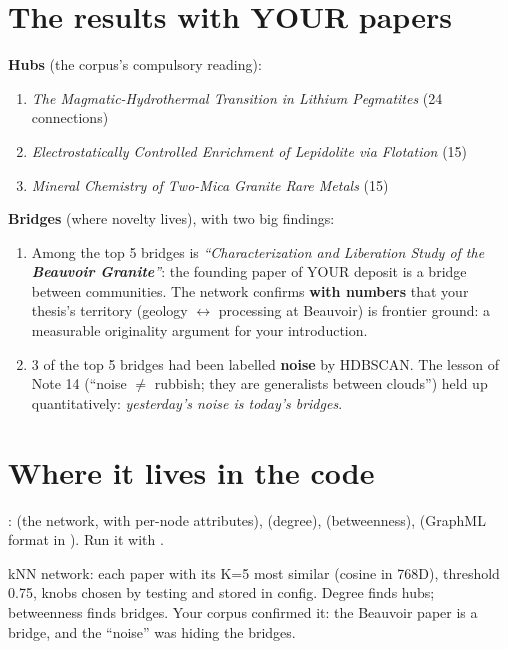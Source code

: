 \documentclass[11pt,a4paper]{article}
\begin{document}
\section{The results with YOUR papers}

\textbf{Hubs} (the corpus's compulsory reading):
\begin{enumerate}
  \item \emph{The Magmatic-Hydrothermal Transition in Lithium Pegmatites} (24 connections)
  \item \emph{Electrostatically Controlled Enrichment of Lepidolite via Flotation} (15)
  \item \emph{Mineral Chemistry of Two-Mica Granite Rare Metals} (15)
\end{enumerate}

\textbf{Bridges} (where novelty lives), with two big findings:
\begin{enumerate}
  \item Among the top 5 bridges is \emph{``Characterization and Liberation Study of the
        \textbf{Beauvoir Granite}''}: the founding paper of YOUR deposit is a bridge between
        communities. The network confirms \textbf{with numbers} that your thesis's territory
        (geology $\leftrightarrow$ processing at Beauvoir) is frontier ground: a measurable
        originality argument for your introduction.
  \item 3 of the top 5 bridges had been labelled \textbf{noise} by HDBSCAN. The lesson of Note
        14 (``noise $\neq$ rubbish; they are generalists between clouds'') held up
        quantitatively: \emph{yesterday's noise is today's bridges}.
\end{enumerate}

\section{Where it lives in the code}

:  (the network, with per-node
attributes),  (degree),  (betweenness),
 (GraphML format in ).
Run it with .

\begin{resumen}
kNN network: each paper with its K=5 most similar (cosine in 768D), threshold 0.75, knobs
chosen by testing and stored in config. Degree finds hubs; betweenness finds bridges. Your
corpus confirmed it: the Beauvoir paper is a bridge, and the ``noise'' was hiding the bridges.
\end{resumen}
\end{document}
